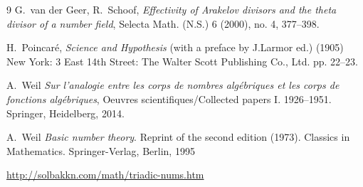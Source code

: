 \documentclass[cupthm]{CUP-JNL-JMJ}
\numberwithin{equation}{section}
\theoremstyle{cupplain}
\theoremstyle{cupdefinition}
\theoremstyle{cupremark}
\theoremstyle{cupproof}
\begin{document}
\begin{Backmatter}
\begin{thebibliography}{9}
 G.~van der Geer, R.~Schoof, {\em Effectivity of Arakelov divisors and the theta divisor of a number field},  Selecta Math. (N.S.) 6 (2000), no. 4, 377--398. 

 H.~Poincar\' e, {\em  Science and Hypothesis} (with a preface by J.Larmor ed.)  (1905) New York: 3 East 14th Street: The Walter Scott Publishing Co., Ltd. pp. 22--23.

 A.~Weil {\em Sur l'analogie entre les corps de nombres alg\' ebriques et les corps de fonctions alg\' ebriques}, Oeuvres scientifiques/Collected papers I. 1926--1951. Springer, Heidelberg, 2014.

 A.~Weil {\em Basic number theory}. Reprint of the second edition (1973). Classics in Mathematics. Springer-Verlag, Berlin, 1995

  \url{http://solbakkn.com/math/triadic-nums.htm}


\end{thebibliography}

\end{Backmatter}
\end{document}
